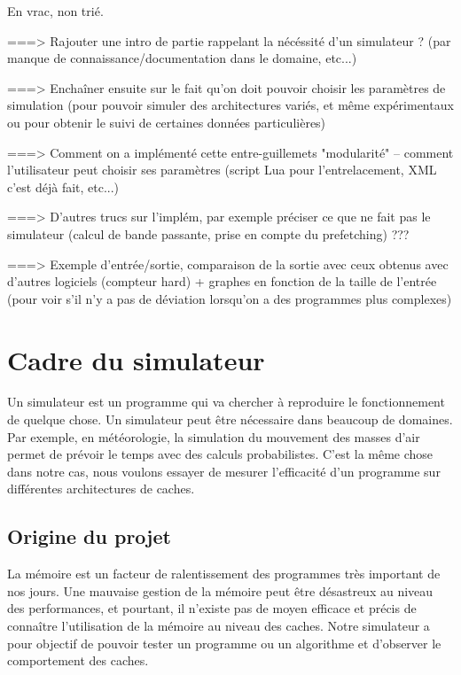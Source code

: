 
En vrac, non trié.

===> Rajouter une intro de partie rappelant la nécéssité d'un simulateur ? (par manque de connaissance/documentation dans le domaine, etc...)

===> Enchaîner ensuite sur le fait qu'on doit pouvoir choisir les paramètres de simulation (pour pouvoir simuler des architectures variés, et même expérimentaux ou pour obtenir le suivi de certaines données particulières)

===> Comment on a implémenté cette entre-guillemets "modularité" -- comment l'utilisateur peut choisir ses paramètres (script Lua pour l'entrelacement, XML c'est déjà fait, etc...)

===> D'autres trucs sur l'implém, par exemple préciser ce que ne fait pas le simulateur (calcul de bande passante, prise en compte du prefetching) ???

===> Exemple d'entrée/sortie, comparaison de la sortie avec ceux obtenus avec d'autres logiciels (compteur hard) + graphes en fonction de la taille de l'entrée (pour voir s'il n'y a pas de déviation lorsqu'on a des programmes plus complexes)



\section{Cadre du simulateur}

Un simulateur est un programme qui va chercher à reproduire le fonctionnement de quelque chose. Un simulateur peut être nécessaire dans beaucoup de domaines. Par exemple, en météorologie, la simulation du mouvement des masses d'air permet de prévoir le temps avec des calculs probabilistes. C'est la même chose dans notre cas, nous voulons essayer de mesurer l'efficacité d'un programme sur différentes architectures de caches.

\subsection{Origine du projet}

La mémoire est un facteur de ralentissement des programmes très important de nos jours. Une mauvaise gestion de la mémoire peut être désastreux au niveau des performances, et pourtant, il n'existe pas de moyen efficace et précis de connaître l'utilisation de la mémoire au niveau des caches. Notre simulateur a pour objectif de pouvoir tester un programme ou un algorithme et d'observer le comportement des caches.

